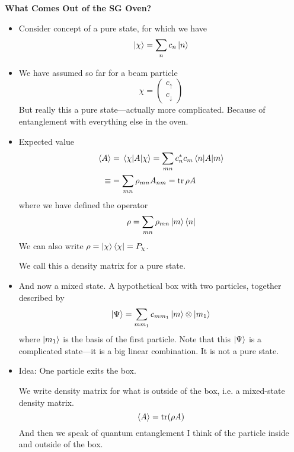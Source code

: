\documentclass[11pt, a4paper]{article}
\newcommand{\ua}{\uparrow}  %
\newcommand{\da}{\downarrow}  %
\begin{document}
\textbf{What Comes Out of the SG Oven?}
\begin{itemize}
    \item Consider concept of a pure state, for which we have
    \begin{equation*}
        \ket{\chi} = \sum_{n} c_{n}\ket{n}
    \end{equation*}


    \item We have assumed so far for a beam particle
    \begin{equation*}
        \chi = 
        \begin{pmatrix}
            c_{\ua}\\
            c_{\da}
        \end{pmatrix}
    \end{equation*}
    But really this a pure state---actually more complicated. Because of entanglement with everything else in the oven. 


    \item Expected value
    \begin{align*}
        \ev{A} &= \mel{\chi}{A}{\chi} = \sum_{mn}c_{n}^{*}c_{m}\mel{n}{A}{m}  \\
        \equiv & = \sum_{mn} \rho_{mn}A_{nm} = \tr \rho A
    \end{align*}
    where we have defined the operator
    \begin{equation*}
        \rho = \sum_{mn}\rho_{mn}\ket{m}\bra{n}
    \end{equation*}
    We can also write $ \rho = \ket{\chi}\bra{\chi} = P_{\chi} $. 

    We call this a density matrix for a pure state.
    
    \item And now a mixed state. A hypothetical box with two particles, together described by
    \begin{equation*}
        \ket{\Psi} = \sum_{m m_{1}} c_{mm_{1}} \ket{m}\otimes \ket{m_{1}}
    \end{equation*}
    where $ \ket{m_{1}} $ is the basis of the first particle. Note that this $ \ket{\Psi} $ is a complicated state---it is a big linear combination. It is not a pure state.
    
    \item Idea: One particle exits the box.

    We write density matrix for what is outside of the box, i.e. a mixed-state density matrix.
    \begin{equation*}
        \ev{A} = \tr(\rho A) 
    \end{equation*}
    And then we speak of quantum entanglement I think of the particle inside and outside of the box. 



\end{itemize}
\end{document}
